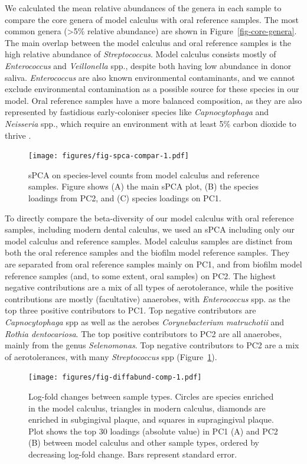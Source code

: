 \documentclass[10pt,a4paper]{article}
\begin{document}
We calculated the mean relative abundances of the genera in each sample
to compare the core genera of model calculus with oral reference
samples. The most common genera (\textgreater5\% relative abundance) are
shown in Figure~\ref{fig-core-genera}. The main overlap between the
model calculus and oral reference samples is the high relative abundance
of \emph{Streptococcus}. Model calculus consists mostly of
\emph{Enterococcus} and \emph{Veillonella} spp., despite both having low
abundance in donor saliva. \emph{Enterococcus} are also known
environmental contaminants, and we cannot exclude environmental
contamination as a possible source for these species in our model. Oral
reference samples have a more balanced composition, as they are also
represented by fastidious early-coloniser species like
\emph{Capnocytophaga} and \emph{Neisseria} spp., which require an
environment with at least 5\% carbon dioxide to thrive
\citep{tonjumNeisseria2017}.

\begin{figure}
    \centering
    \texttt{[image: figures/fig-spca-compar-1.pdf]}
    \caption{\label{fig-spca-compar}sPCA on species-level counts from model
calculus and reference samples. Figure shows (A) the main sPCA plot, (B)
the species loadings from PC2, and (C) species loadings on PC1.}
\end{figure}

To directly compare the beta-diversity of our model calculus with oral
reference samples, including modern dental calculus, we used an sPCA
including only our model calculus and reference samples. Model calculus
samples are distinct from both the oral reference samples and the
biofilm model reference samples. They are separated from oral reference
samples mainly on PC1, and from biofilm model reference samples (and, to
some extent, oral samples) on PC2. The highest negative contributions
are a mix of all types of aerotolerance, while the positive
contributions are mostly (facultative) anaerobes, with
\emph{Enterococcus} spp. as the top three positive contributors to PC1.
Top negative contributors are \emph{Capnocytophaga} spp as well as the
aerobes \emph{Corynebacterium matruchotii} and \emph{Rothia
dentocariosa}. The top positive contributors to PC2 are all anaerobes,
mainly from the genus \emph{Selenomonas}. Top negative contributors to
PC2 are a mix of aerotolerances, with many \emph{Streptococcus} spp
(Figure~\ref{fig-spca-compar}).

\begin{figure}
    \centering
    \texttt{[image: figures/fig-diffabund-comp-1.pdf]}
    \caption{\label{fig-diffabund-comp}Log-fold changes between sample
types. Circles are species enriched in the model calculus, triangles in
modern calculus, diamonds are enriched in subgingival plaque, and
squares in supragingival plaque. Plot shows the top 30 loadings
(absolute value) in PC1 (A) and PC2 (B) between model calculus and other
sample types, ordered by decreasing log-fold change. Bars represent
standard error.}
\end{figure}
\end{document}
